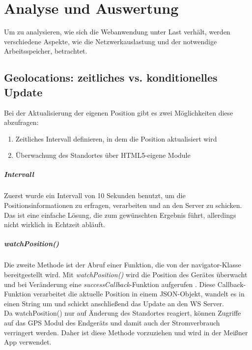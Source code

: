 \chapter{Analyse und Auswertung}
Um zu analysieren, wie sich die Webanwendung unter Last verhält, werden verschiedene Aspekte, wie die Netzwerkauslastung und der notwendige Arbeitsspeicher, betrachtet.

\section{Geolocations: zeitliches vs. konditionelles Update}
Bei der Aktualisierung der eigenen Position gibt es zwei Möglichkeiten diese abzufragen:

\begin{enumerate}
	\item Zeitliches Intervall definieren, in dem die Position aktualisiert wird
	\item Überwachung des Standortes über HTML5-eigene Module
\end{enumerate}

\paragraph{Intervall}
Zuerst wurde ein Intervall von 10 Sekunden benutzt, um die Positionsinformationen zu erfragen, verarbeiten und an den Server zu schicken. Das ist eine einfache Lösung, die zum gewünschten Ergebnis führt, allerdings nicht wirklich in Echtzeit abläuft.

\paragraph{watchPosition()}
Die zweite Methode ist der Abruf einer Funktion, die von der navigator-Klasse bereitgestellt wird. Mit \emph{watchPosition()} wird die Position des Gerätes überwacht und bei Veränderung eine \emph{successCallback}-Funktion aufgerufen \cite{geolocationapi}. Diese Callback-Funktion verarbeitet die aktuelle Position in einem JSON-Objekt, wandelt es in einen String um und schickt anschließend das Update an den WS Server.\\
Da watchPosition() nur auf Änderung des Standortes reagiert, können Zugriffe auf das GPS Modul des Endgeräts und damit auch der Stromverbrauch verringert werden. Daher ist diese Methode vorzuziehen und wird in der Meißner App verwendet.

